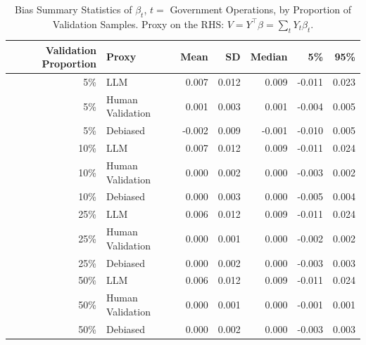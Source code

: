 \begin{table}

\caption{\label{tab:unnamed-chunk-1}Bias Summary Statistics of $\beta_{t}$, $t=$ Government Operations, by Proportion of Validation Samples.
      Proxy on the RHS: $V = Y^\top \beta = \sum_{t} Y_t \beta_t$.}
\centering
\begin{tabular}[t]{rlrrrrr}
\toprule
Validation Proportion & Proxy & Mean & SD & Median & 5\% & 95\%\\
\midrule
5\% & LLM & 0.007 & 0.012 & 0.009 & -0.011 & 0.023\\
5\% & Human Validation & 0.001 & 0.003 & 0.001 & -0.004 & 0.005\\
5\% & Debiased & -0.002 & 0.009 & -0.001 & -0.010 & 0.005\\
10\% & LLM & 0.007 & 0.012 & 0.009 & -0.011 & 0.024\\
10\% & Human Validation & 0.000 & 0.002 & 0.000 & -0.003 & 0.002\\
10\% & Debiased & 0.000 & 0.003 & 0.000 & -0.005 & 0.004\\
25\% & LLM & 0.006 & 0.012 & 0.009 & -0.011 & 0.024\\
25\% & Human Validation & 0.000 & 0.001 & 0.000 & -0.002 & 0.002\\
25\% & Debiased & 0.000 & 0.002 & 0.000 & -0.003 & 0.003\\
50\% & LLM & 0.006 & 0.012 & 0.009 & -0.011 & 0.024\\
50\% & Human Validation & 0.000 & 0.001 & 0.000 & -0.001 & 0.001\\
50\% & Debiased & 0.000 & 0.002 & 0.000 & -0.003 & 0.003\\
\bottomrule
\end{tabular}
\end{table}
